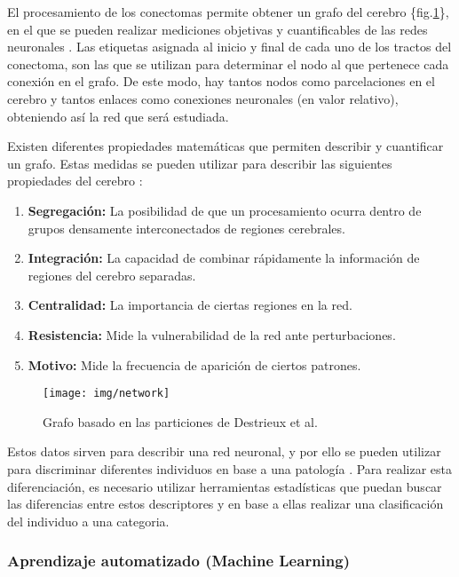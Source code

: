 \documentclass[fleqn,12pt]{uicarticle} %
\begin{document}
El procesamiento de los conectomas permite obtener un grafo del cerebro \{fig.\ref{fig:network}\}, en el que se pueden realizar mediciones objetivas y cuantificables de las redes neuronales \cite{Mori2002}. Las etiquetas asignada al inicio y final de cada uno de los tractos del conectoma, son las que se utilizan para determinar el nodo al que pertenece cada conexión en el grafo. De este modo, hay tantos nodos como parcelaciones en el cerebro y tantos enlaces como conexiones neuronales (en valor relativo), obteniendo así la red que será estudiada.

Existen diferentes propiedades matemáticas que permiten describir y cuantificar un grafo. Estas medidas se pueden utilizar para describir las siguientes propiedades del cerebro \cite{Rubinov2010}:
\begin{enumerate}[noitemsep]
\item \textbf{Segregación:} La posibilidad de que  un procesamiento ocurra dentro de grupos densamente interconectados de regiones cerebrales.
\item \textbf{Integración:} La capacidad de combinar rápidamente la información de regiones del cerebro separadas.
\item \textbf{Centralidad:} La importancia de ciertas regiones en la red.
\item \textbf{Resistencia:} Mide la vulnerabilidad de la red ante perturbaciones.
\item \textbf{Motivo:} Mide la frecuencia de aparición de ciertos patrones.
\end{enumerate}

\begin{figure}[p]
	\centering
	\texttt{[image: img/network]}
	\vspace{5mm} 
	\caption{Grafo basado en las particiones de Destrieux et al.\cite{Destrieux2010}}
	\label{fig:network}
\end{figure}

Estos datos sirven para describir una red neuronal, y por ello se pueden utilizar para discriminar diferentes individuos en base a una patología \cite{Muthuraman2016}. Para realizar esta diferenciación, es necesario utilizar herramientas estadísticas que puedan buscar las diferencias entre estos descriptores y en base a ellas realizar una clasificación del individuo a una categoria.


\subsubsection{Aprendizaje automatizado (Machine Learning)}
\end{document}
